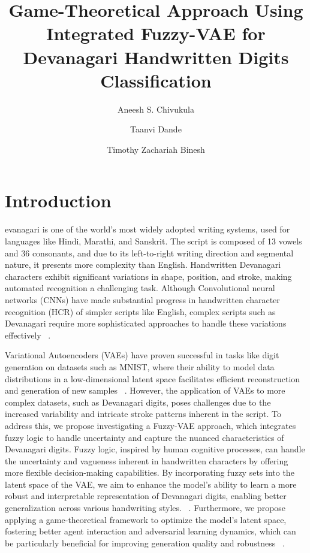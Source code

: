 \documentclass[9pt,a4paper,twoside]{rho-class/rho}
\title {\hyphenpenalty=10000\exhyphenpenalty=10000 Game-Theoretical Approach Using Integrated Fuzzy-VAE for Devanagari Handwritten Digits Classification}
\author[1,$\dagger$]{Aneesh S. Chivukula}
\author[2]{Taanvi Dande}
\author[3]{Timothy Zachariah Binesh}
\affil[1]{aneesh.chivukula@hyderabad.bits-pilani.ac.in}
\affil[2]{f20222007@hyderabad.bits-pilani.ac.in}
\affil[3]{f20212978@hyderabad.bits-pilani.ac.in}
\affil[$\dagger$]{These authors contributed equally to this project.}
\begin{document}
	
    \maketitle
    \thispagestyle{firststyle}
    \linenumbers


\section{Introduction}

    evanagari is one of the world's most widely adopted writing systems, used for languages like Hindi, Marathi, and Sanskrit. The script is composed of 13 vowels and 36 consonants, and due to its left-to-right writing direction and segmental nature, it presents more complexity than English. Handwritten Devanagari characters exhibit significant variations in shape, position, and stroke, making automated recognition a challenging task. Although Convolutional neural networks (CNNs) have made substantial progress in handwritten character recognition (HCR) of simpler scripts like English, complex scripts such as Devanagari require more sophisticated approaches to handle these variations effectively ~\cite{masrat2024}.
    
    Variational Autoencoders (VAEs) have proven successful in tasks like digit generation on datasets such as MNIST, where their ability to model data distributions in a low-dimensional latent space facilitates efficient reconstruction and generation of new samples ~\cite{kingma}. However, the application of VAEs to more complex datasets, such as Devanagari digits, poses challenges due to the increased variability and intricate stroke patterns inherent in the script.
   To address this, we propose investigating a Fuzzy-VAE approach, which integrates fuzzy logic to handle uncertainty and capture the nuanced characteristics of Devanagari digits. Fuzzy logic, inspired by human cognitive processes, can handle the uncertainty and vagueness inherent in handwritten characters by offering more flexible decision-making capabilities. By incorporating fuzzy sets into the latent space of the VAE, we aim to enhance the model's ability to learn a more robust and interpretable representation of Devanagari digits, enabling better generalization across various handwriting styles. ~\cite{zadeh}. Furthermore, we propose applying a game-theoretical framework to optimize the model’s latent space, fostering better agent interaction and adversarial learning dynamics, which can be particularly beneficial for improving generation quality and robustness ~\cite{nash}.
    
\end{document}
